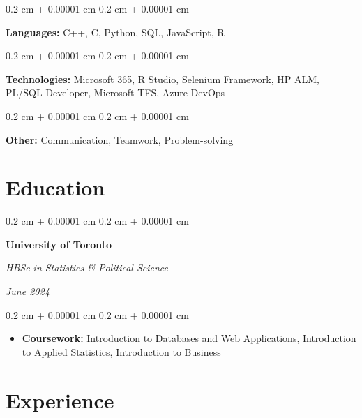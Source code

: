 \documentclass[10pt, letterpaper]{article}
\newenvironment{highlights}{
    \begin{itemize}[
        topsep=0.10 cm,
        parsep=0.10 cm,
        partopsep=0pt,
        itemsep=0pt,
        leftmargin=0.4 cm + 10pt
    ]
}{
    \end{itemize}
} %
\newenvironment{onecolentry}{
    \begin{adjustwidth}{
        0.2 cm + 0.00001 cm
    }{
        0.2 cm + 0.00001 cm
    }
}{
    \end{adjustwidth}
} %
\newenvironment{twocolentry}[2][]{
    \onecolentry
    \def\secondColumn{#2}
    \setcolumnwidth{\fill, 4.5 cm}
    \begin{paracol}{2}
}{
    \switchcolumn \raggedleft \secondColumn
    \end{paracol}
    \endonecolentry
} %
\begin{document}
        
        \begin{onecolentry}
            \textbf{Languages:} C++, C, Python, SQL, JavaScript, R
        \end{onecolentry}

        \vspace{0.2 cm}

        \begin{onecolentry}
            \textbf{Technologies:} Microsoft 365, R Studio, Selenium Framework, HP ALM, PL/SQL Developer, Microsoft TFS, Azure DevOps
        \end{onecolentry}

        \vspace{0.2 cm}

        \begin{onecolentry}
            \textbf{Other:} Communication, Teamwork, Problem-solving
        \end{onecolentry}


    
    \section{Education}



        
        \begin{twocolentry}{
            
            
        \textit{June 2024}}
            \textbf{University of Toronto}

            \textit{HBSc in Statistics \& Political Science}
        \end{twocolentry}

        \vspace{0.10 cm}
        \begin{onecolentry}
            \begin{highlights}
                \item \textbf{Coursework:} Introduction to Databases and Web Applications, Introduction to Applied Statistics, Introduction to Business
            \end{highlights}
        \end{onecolentry}



    
    \section{Experience}
\end{document}
